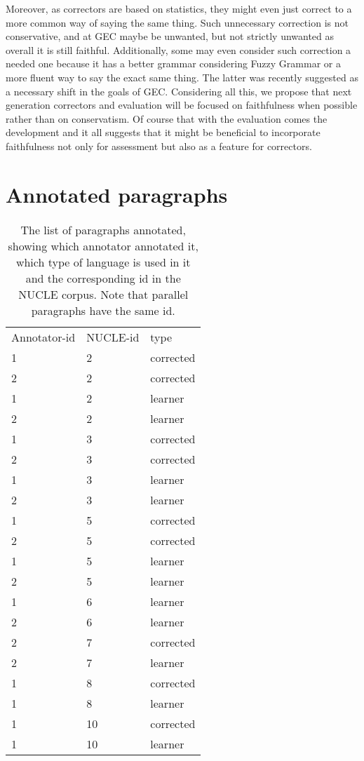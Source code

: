		Moreover, as correctors are based on statistics, they might even
		just correct to a more common way of saying the same thing. Such unnecessary
		correction is not conservative, and at GEC maybe be unwanted, but not strictly unwanted as overall
		it is still faithful. Additionally, some may even
		consider such correction a needed one because it has a better grammar considering
		Fuzzy Grammar\cite{lakoff1973fuzzy,madnani2011they} or a more fluent
		way to say the exact same thing. The latter was recently suggested as a necessary
		shift in the goals of GEC\cite{sakaguchi2016reassessing}.
		Considering all this, we propose that next generation correctors and evaluation will be focused on faithfulness
		when possible rather than on conservatism. Of course that with the evaluation comes the development and it all suggests that it might be beneficial to incorporate faithfulness not only for assessment but also as a feature for correctors. 
		
		
		
		
		\appendix
		\section{Annotated paragraphs}
		\begin{table}[]
			\centering
			\begin{tabular}{lll}
				Annotator-id & NUCLE-id & type      \\
				1         & 2  & corrected \\
				2         & 2  & corrected \\
				1         & 2  & learner   \\
				2         & 2  & learner   \\
				1         & 3  & corrected \\
				2         & 3  & corrected \\
				1         & 3  & learner   \\
				2         & 3  & learner   \\
				1         & 5  & corrected \\
				2         & 5  & corrected \\
				1         & 5  & learner   \\
				2         & 5  & learner   \\
				1         & 6  & learner   \\
				2         & 6  & learner   \\
				2         & 7  & corrected \\
				2         & 7  & learner   \\
				1         & 8  & corrected \\
				1         & 8  & learner   \\
				1         & 10 & corrected \\
				1         & 10 & learner  
			\end{tabular}
			\caption{The list of paragraphs annotated, showing which annotator annotated it, which type of language is used in it and the corresponding id in the NUCLE corpus. Note that parallel paragraphs have the same id.\label{tab:annotated-paragraphs}}
		\end{table}
	
